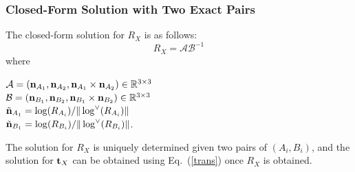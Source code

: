 \documentclass[twocolumn,10pt]{asme2ej}
\newcommand{\nn}{{\bf n}}
\newcommand{\ttt}{{\bf t}}
\begin{document}
\subsubsection{Closed-Form Solution with Two Exact Pairs}
The closed-form solution for $R_{X}$ is as follows:
\begin{equation}
R_{X} = \mathcal{A}\mathcal{B}^{-1}
\label{Lie_Rotation}
\end{equation}
where\\

\begin{center}
$\mathcal{A} = (\nn_{A_{1}}, \nn_{A_{2}}, \nn_{A_{1}} \times \nn_{A_{2}}) \in \mathbb{R}^{3 \times 3}$\\
 $\mathcal{B} = (\nn_{B_{1}}, \nn_{B_{2}}, \nn_{B_{1}} \times \nn_{B_{2}}) \in \mathbb{R}^{3 \times 3} $\\
$\tilde{\nn}_{A_{1}} = \log(R_{A_{i}})/\|\log^\vee(R_{A_i})\|$\\
$\tilde{\nn}_{B_{1}} = \log(R_{B_{i}})/\|\log^\vee(R_{B_i})\|$.
\end{center}
The solution for $R_X$ is uniquely determined given two pairs of $(A_i, B_i)$, and the solution for $\ttt_{X}$ can be obtained using Eq.~(\ref{trans}) once $R_{X}$ is obtained.\\

\end{document}
